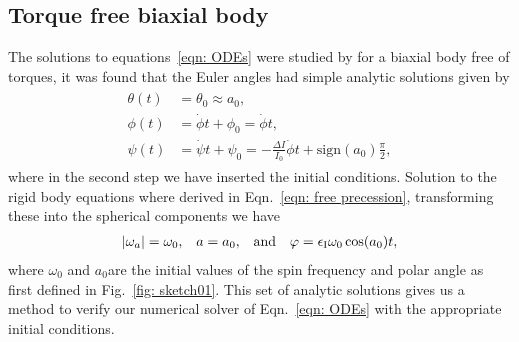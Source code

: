 \documentclass[../full_thesis/full_thesis.tex]{subfiles}
\begin{document}
\subsection{Torque free biaxial body}
\label{sec: biaxial body with no torque}

The solutions to equations~\eqref{eqn: ODEs} were studied by \citet{Jones2001}
for a biaxial body free of torques, it was found that the Euler angles had
simple analytic solutions given by
\begin{align}
\begin{split}
    \theta(t) & = \theta_{0} \approx a_{0}, \\
    \phi(t) & = \dot{\phi}t + \phi_{0} = \dot{\phi} t, \\
    \psi(t) & = \dot{\psi}t + \psi_{0}=
 -\frac{\Delta I}{I_0}\dot{\phi} t + \textrm{sign}(a_0)\frac{\pi}{2},
\end{split}
\label{eqn: euler angles torque free evolution}
\end{align}
where in the second step we have inserted the initial conditions. Solution to
the rigid body equations where derived in Eqn.~\eqref{eqn: free precession},
transforming these into the spherical components we have
\begin{align}
|\omega_a| = \omega_0, && a = a_0, &&\textrm{and} && \varphi=\epsilon_{\mathrm{I}}\omega_0 \cos(a_0) t,
\label{eqn: spherical spin torque free evolution}
\end{align}
where $\omega_0$ and $a_0$are the initial values of the spin frequency and
polar angle as first defined in Fig.~\ref{fig: sketch01}.
This set of analytic solutions gives
us a method to verify our numerical solver of Eqn.~\eqref{eqn: ODEs} with the
appropriate initial conditions.
\end{document}
